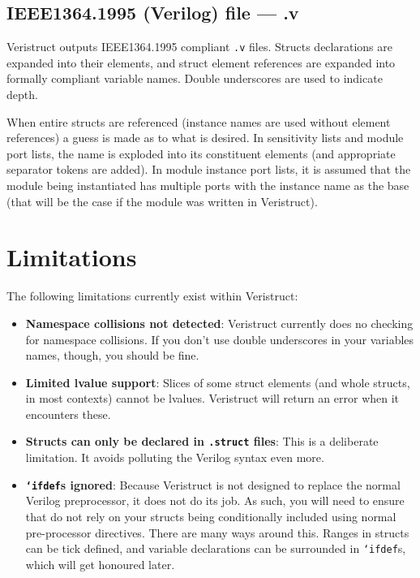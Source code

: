 \documentclass[a4paper]{article} \usepackage[dvips]{graphicx}
\begin{document}
\subsection{IEEE1364.1995 (Verilog) file --- .v}
\label{sec:v_files}
Veristruct outputs IEEE1364.1995 compliant \texttt{.v} files. Structs
declarations are expanded into their elements, and struct element
references are expanded into formally compliant variable names. Double
underscores are used to indicate depth.

When entire structs are referenced (instance names are used without
element references) a guess is made as to what is desired. In
sensitivity lists and module port lists, the name is exploded into its
constituent elements (and appropriate separator tokens are added). In
module instance port lists, it is assumed that the module being
instantiated has multiple ports with the instance name as the base
(that will be the case if the module was written in Veristruct).

\section{Limitations}
\label{sec:limitations}
The following limitations currently exist within Veristruct:
\begin{itemize}
\item \textbf{Namespace collisions not detected}: Veristruct currently
  does no checking for namespace collisions. If you don't use double
  underscores in your variables names, though, you should be fine.
\item \textbf{Limited lvalue support}: Slices of some struct elements
  (and whole structs, in most contexts) cannot be lvalues. Veristruct
  will return an error when it encounters these.
\item \textbf{Structs can only be declared in \texttt{.struct} files}:
  This is a deliberate limitation. It avoids polluting the Verilog
  syntax even more.
\item \textbf{\texttt{`ifdef}s ignored}: Because Veristruct is not
  designed to replace the normal Verilog preprocessor, it does not do
  its job. As such, you will need to ensure that do not rely on your
  structs being conditionally included using normal pre-processor
  directives. There are many ways around this. Ranges in structs can
  be tick defined, and variable declarations can be surrounded in
  \texttt{`ifdef}s, which will get honoured later.
\end{itemize}
\end{document}
